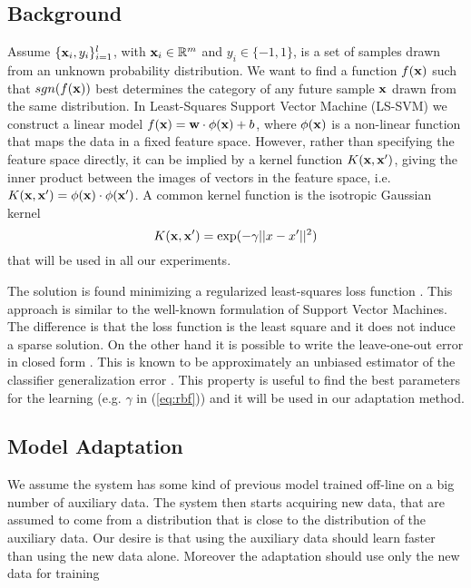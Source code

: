 \subsection{Background}

Assume $\{\mathbf{x}_i,y_i\}_{i=1}^l$, with $\mathbf{x}_i \in \mathbb{R}^m$ and $y_i \in
\{-1,1\}$, is a set of samples drawn from an unknown probability
distribution. We want to find a function $f(\mathbf{x})$ such that
$sgn(f(\mathbf{x}))$ best determines the category of any future sample $\mathbf{x}$
drawn from the same distribution. In Least-Squares Support Vector Machine (LS-SVM)
we construct a linear model $f(\mathbf{x})=\mathbf{w} \cdot \phi(\mathbf{x}) + b$, where
$\phi(\mathbf{x})$ is a non-linear function that maps the data in a fixed feature space.
However, rather than specifying the feature space directly,
it can be implied by a kernel function $K(\mathbf{x},\mathbf{x}')$, giving the
inner product between the images of vectors in the feature
space, i.e. $K(\mathbf{x},\mathbf{x}')=\phi(\mathbf{x}) \cdot \phi(\mathbf{x}')$.
A common kernel function is the isotropic Gaussian kernel
\begin{equation}
	K(\xx,\xx')=\exp(-\gamma ||x-x'||^2)
	\label{eq:rbf}
\end{equation}
that will be used in all our experiments.

The solution is found minimizing a regularized least-squares loss function \cite{Cristianini00}.
This approach is similar to the well-known formulation of Support Vector
Machines. The difference is that the loss function is the least square and it
does not induce a sparse solution. On the other hand it is possible to write
the leave-one-out error in closed form \cite{Rifkin07}. This is known to be
approximately an unbiased estimator of the classifier generalization error
\cite{LuntzB69}. This property is useful to find the best parameters for the
learning (e.g. $\gamma$ in (\ref{eq:rbf})) and it will be used in our
adaptation method.

\subsection{Model Adaptation}

We assume the system has some kind of previous model trained off-line on a big
number of auxiliary data. The system then starts acquiring new data, that are
assumed to come from a distribution that is close to the distribution of the
auxiliary data. Our desire is that using the auxiliary data should learn faster
than using the new data alone. Moreover the adaptation should use only the new
data for training 

